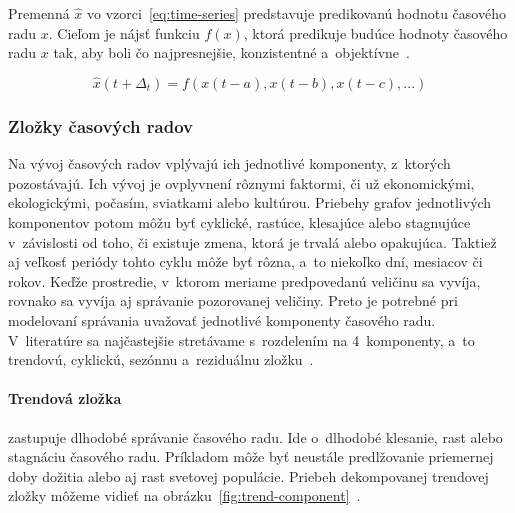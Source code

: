 \documentclass[a4paper,twoside,slovak,12pt,appendix]{article}
\begin{document}
Premenná $\hat{x}$ vo vzorci~\ref{eq:time-series} predstavuje predikovanú
hodnotu časového radu $x$. Cieľom je nájsť funkciu $f(x)$, ktorá predikuje
budúce hodnoty časového radu $x$ tak, aby boli čo najpresnejšie, konzistentné
a~objektívne~\cite{Sapankevych2009}.

\begin{equation}
  \hat{x}(t+\Delta_t) = f(x(t-a), x(t-b), x(t-c), ...)
  \label{eq:time-series}
\end{equation}


\subsubsection{Zložky časových radov}
Na vývoj časových radov vplývajú ich jednotlivé komponenty, z~ktorých
pozostávajú. Ich vývoj je ovplyvnení rôznymi faktormi, či už ekonomickými,
ekologickými, počasím, sviatkami alebo kultúrou. Priebehy grafov jednotlivých
komponentov potom môžu byť cyklické, rastúce, klesajúce alebo stagnujúce
v~závislosti od toho, či existuje zmena, ktorá je trvalá alebo opakujúca.
Taktiež aj veľkosť periódy tohto cyklu môže byť rôzna, a~to niekoľko dní,
mesiacov či rokov. Keďže prostredie, v~ktorom meriame predpovedanú veličinu sa
vyvíja, rovnako sa vyvíja aj správanie pozorovanej veličiny. Preto je potrebné
pri modelovaní správania uvažovať jednotlivé komponenty časového radu.
V~literatúre sa najčastejšie stretávame s~rozdelením na 4~komponenty, a~to
trendovú, cyklickú, sezónnu a~reziduálnu zložku~\cite{Grmanova2016}.

\paragraph{Trendová zložka} zastupuje dlhodobé správanie časového radu. Ide
o~dlhodobé klesanie, rast alebo stagnáciu časového radu. Príkladom môže byť
neustále predlžovanie priemernej doby dožitia alebo aj rast svetovej populácie.
Priebeh dekompovanej trendovej zložky môžeme vidieť na
obrázku~\ref{fig:trend-component}~\cite{Agrawal2013}.
\end{document}
